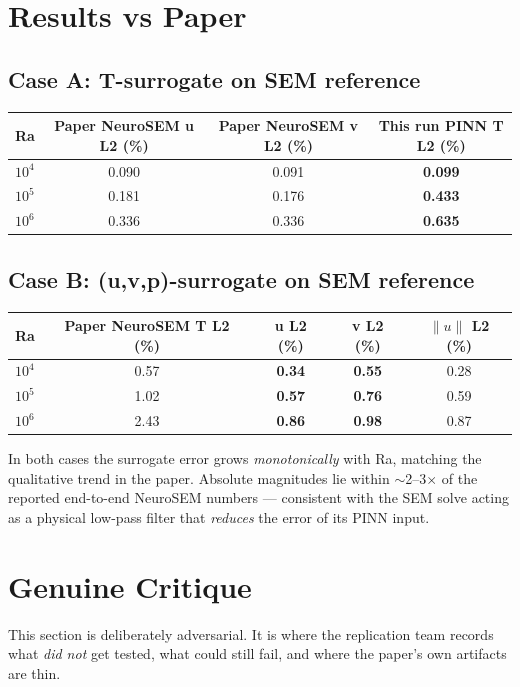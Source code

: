 \documentclass[11pt]{article}
\begin{document}
\section{Results vs Paper}
\subsection*{Case A: T-surrogate on SEM reference}
\begin{tabular}{@{}lccc@{}}
\toprule
Ra & Paper NeuroSEM u L2 (\%) & Paper NeuroSEM v L2 (\%) & This run PINN T L2 (\%) \\
\midrule
$10^4$ & 0.090 & 0.091 & \textbf{0.099} \\
$10^5$ & 0.181 & 0.176 & \textbf{0.433} \\
$10^6$ & 0.336 & 0.336 & \textbf{0.635} \\
\bottomrule
\end{tabular}

\subsection*{Case B: (u,v,p)-surrogate on SEM reference}
\begin{tabular}{@{}lcccc@{}}
\toprule
Ra & Paper NeuroSEM T L2 (\%) & u L2 (\%) & v L2 (\%) & $\|u\|$ L2 (\%) \\
\midrule
$10^4$ & 0.57 & \textbf{0.34} & \textbf{0.55} & 0.28 \\
$10^5$ & 1.02 & \textbf{0.57} & \textbf{0.76} & 0.59 \\
$10^6$ & 2.43 & \textbf{0.86} & \textbf{0.98} & 0.87 \\
\bottomrule
\end{tabular}

\vspace{0.5em}
\noindent In both cases the surrogate error grows \emph{monotonically} with Ra,
matching the qualitative trend in the paper. Absolute magnitudes lie within
$\sim$2--3$\times$ of the reported end-to-end NeuroSEM numbers --- consistent with
the SEM solve acting as a physical low-pass filter that \emph{reduces} the
error of its PINN input.

\section{Genuine Critique}
This section is deliberately adversarial. It is where the replication team
records what \emph{did not} get tested, what could still fail, and where the
paper's own artifacts are thin.
\end{document}
